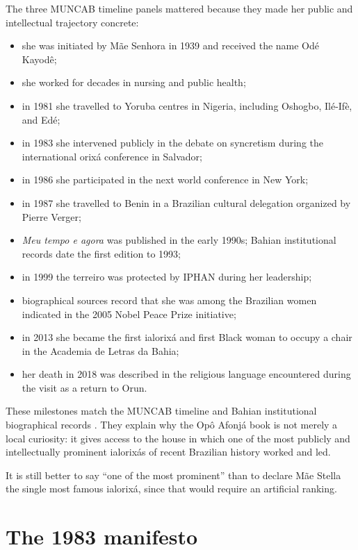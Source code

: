 The three MUNCAB timeline panels mattered
because they made her public and
intellectual trajectory concrete:

\begin{itemize}
\item she was initiated by M\~ae Senhora in
1939 and received the name Od\'e Kayod\^e;
\item she worked for decades in nursing and
public health;
\item in 1981 she travelled to Yoruba
centres in Nigeria, including Oshogbo,
Il\'e-If\`e, and Ed\'e;
\item in 1983 she intervened publicly in
the debate on syncretism during the
international orix\'a conference in
Salvador;
\item in 1986 she participated in the next
world conference in New York;
\item in 1987 she travelled to Benin in a
Brazilian cultural delegation organized by
Pierre Verger;
\item \emph{Meu tempo e agora} was
published in the early 1990s; Bahian
institutional records date the first
edition to 1993;
\item in 1999 the terreiro was protected by
IPHAN during her leadership;
\item biographical sources record that she
was among the Brazilian women indicated in
the 2005 Nobel Peace Prize initiative;
\item in 2013 she became the first
ialorix\'a and first Black woman to occupy
a chair in the Academia de Letras da Bahia;
\item her death in 2018 was described in
the religious language encountered during
the visit as a return to Orun.
\end{itemize}

These milestones match the MUNCAB timeline
and Bahian institutional biographical
records \cite{alba-mae-stella,mae-stella-alb}.
They explain why the Op\^o Afonj\'a book is
not merely a local curiosity: it gives
access to the house in which one of the
most publicly and intellectually prominent
ialorix\'as of recent Brazilian history
worked and led.

It is still better to say ``one of the most
prominent'' than to declare M\~ae Stella
the single most famous ialorix\'a, since
that would require an artificial ranking.

\section{The 1983 manifesto}
\label{section-manifesto-1983}

